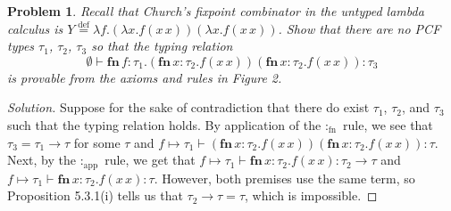 \documentclass{article}
\newtheorem{problem}{Problem}[section]}
\newcommand{\f}{\rightarrow}
\begin{document}
\begin{problem}
    Recall that Church's fixpoint combinator in the untyped lambda calculus is
    $Y\stackrel{\text{def}}{=}\lambda f.(\lambda x.f (x\,x))(\lambda
    x.f(x\,x))$. Show that there are no PCF types $\tau_1$, $\tau_2$, $\tau_3$
    so that the typing relation
    \[
        \emptyset\vdash
        \textbf{fn}\,f:\tau_1.(\textbf{fn}\,x:\tau_2.f(x\,x))(\textbf{fn}\,x:\tau_2.f(x\,x)):\tau_3
    \]
    is provable from the axioms and rules in Figure 2.
\end{problem}
\begin{proof}[Solution]
    Suppose for the sake of contradiction that there do exist $\tau_1$,
    $\tau_2$, and $\tau_3$ such that the typing relation holds. By application
    of the $:_\text{fn}$ rule, we see that $\tau_3=\tau_1\rightarrow\tau$ for
    some $\tau$ and $f\mapsto\tau_1\vdash
    (\textbf{fn}\,x:\tau_2.f(x\,x))(\textbf{fn}\,x:\tau_2.f(x\,x)) : \tau$.
    Next, by the $:_\text{app}$ rule, we get that $f\mapsto\tau_1\vdash
    \textbf{fn}\,x:\tau_2.f(x\,x):\tau_2\f\tau$ and $f\mapsto\tau_1\vdash
    \textbf{fn}\,x:\tau_2.f(x\,x):\tau$. However, both premises use the same
    term, so Proposition 5.3.1(i) tells us that $\tau_2\f\tau=\tau$, which is
    impossible.
\end{proof}
\end{document}
